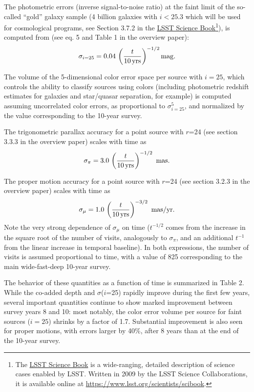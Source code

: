 \documentclass[DM,lsstdraft,toc,usenatbib]{lsstdoc}
\begin{document}
The photometric errors (inverse signal-to-noise ratio) at the faint limit of the so-called 
``gold'' galaxy sample (4 billion galaxies with $i<25.3$ which will be used for cosmological
programs, see Section 3.7.2 in the \href{https://www.lsst.org/scientists/scibook}{LSST Science Book}\footnote{The 
\href{https://www.lsst.org/scientists/scibook}{LSST Science Book} 
is a wide-ranging, detailed description of science cases enabled by LSST. Written in 2009 by the LSST Science Collaborations, it is available online
at \href{https://www.lsst.org/scientists/scibook}{https://www.lsst.org/scientists/scibook}.}), is computed from (see eq. 5 and Table 1 
in the overview paper):
\begin{equation} 
                \sigma_{i=25} = 0.04 \, \left({t \over 10 \, {\rm yrs}}\right)^{-1/2} {\rm mag.}
\end{equation}

The volume of the 5-dimensional color error space per source with $i=25$,  which controls the ability 
to classify sources using colors (including photometric redshift estimates for galaxies and star/quasar
separation, for example) is computed assuming uncorrelated color errors, as proportional
to $\sigma^5_{i=25}$, and normalized by the value corresponding to the 10-year survey. 

The trigonometric parallax accuracy for a point source with $r$=24 (see section 3.3.3 in the 
overview paper) scales with time as 
\begin{equation}
        \sigma_\pi = 3.0 \,  \left({t \over 10 \, {\rm yrs}}\right)^{-1/2}  \,\,  {\rm mas.} 
\end{equation}

The proper motion accuracy for a point source with $r$=24 (see section 3.2.3 in the overview paper)
scales with time as 
\begin{equation}
        \sigma_\mu = 1.0 \,  \left({t \over 10 \, {\rm yrs}}\right)^{-3/2}   \,\, {\rm mas/yr.} 
\end{equation}
Note the very strong dependence of  $\sigma_\mu$ on time ($t^{-1/2}$ comes from the
increase in the square root of the number of visits, analogously to $\sigma_\pi$, and 
an additional $t^{-1}$ from the linear increase in temporal baseline).  In both expressions,
the number of visits is assumed proportional to time, with a value of 825 corresponding to the 
main wide-fast-deep 10-year survey. 

The behavior of these quantities as a function of time is summarized in Table 2. While 
the co-added depth and $\sigma$($i$=25) rapidly improve during the first few years, 
several important quantities continue to show marked improvement between survey 
years 8 and 10: most notably, the color error volume per source for faint sources ($i=25$) 
shrinks by a factor of 1.7.  Substantial improvement is also seen for proper motions, 
with errors larger by 40\%, after 8 years than at the end of the 10-year survey.  
\end{document}
